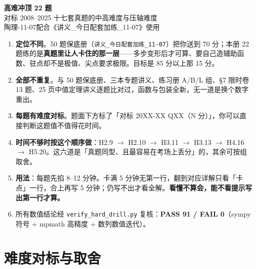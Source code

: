 \documentclass[11pt,a4paper]{ctexart}
\begin{document}
\begin{center}
  {\LARGE\bfseries 高难冲顶 22 题}\\[4pt]
  {\large 对标 2008--2025 十七套真题的中高难度与压轴难度}\\[4pt]
  {\small 陶理-11-07\quad 配合《讲义\_今日配套加练\_11-07》使用}
\end{center}

\begin{keypoint}[这本不是保底册]
\begin{enumerate}
\item \textbf{定位不同}。50 题保底册（\texttt{讲义\_今日配套加练\_11-07}）把你送到 70 分；本册 22 题练的是\textbf{真题里让人卡住的那一层}——多步变形后才可算、要自己造辅助函数、驻点却不是极值、尖点要求极限。目标是 85 分以上那 15 分。
\item \textbf{全部不重复}。与 50 题保底册、三本专题讲义、练习册 A/B/L 组、\S 7 限时卷 13 题、25 页中值定理讲义逐题比对过，函数与包装全新，无一道是换个数字重出。
\item \textbf{每题有难度对标}。题面下方标了「对标 20XX-XX QXX（N 分）」，你可以直接判断这题值不值得花时间。
\item \textbf{时间不够时按这个顺序做}：H2.9 $\to$ H2.10 $\to$ H3.11 $\to$ H3.13 $\to$ H4.16 $\to$ H5.20。这六道是「真题同型、且最容易在考场上丢分」的，其余可按组取舍。
\item \textbf{用法}：每题先掐 8--12 分钟。卡满 5 分钟无第一行，翻到对应详解只看「卡点」一行，合上再写 5 分钟；仍写不出才看全解。\textbf{看懂不算会，能不看提示写出第一行才算。}
\item 所有数值结论经 \texttt{verify\_hard\_drill.py} 复核：\textbf{PASS 91 / FAIL 0}（sympy 符号 + mpmath 高精度 + 数列数值迭代）。
\end{enumerate}
\end{keypoint}

\section{难度对标与取舍}
\end{document}
